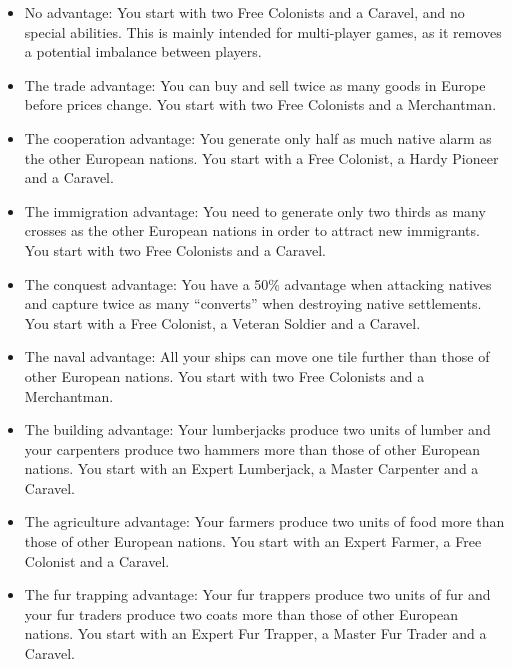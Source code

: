 \documentclass[12pt]{book}
\begin{document}
\begin{itemize}

\item No advantage: You start with two Free Colonists and a Caravel,
  and no special abilities. This is mainly intended for multi-player
  games, as it removes a potential imbalance between players.

\item The trade advantage: You can buy and sell twice as many goods in
  Europe before prices change. You start with two Free Colonists and a
  Merchantman.

\item The cooperation advantage: You generate only half as much native
  alarm as the other European nations. You start with a Free Colonist,
  a Hardy Pioneer and a Caravel.

\item The immigration advantage: You need to generate only two thirds
  as many crosses as the other European nations in order to attract
  new immigrants. You start with two Free Colonists and a Caravel.

\item The conquest advantage: You have a 50\% advantage when attacking
  natives and capture twice as many ``converts'' when destroying
  native settlements. You start with a Free Colonist, a Veteran
  Soldier and a Caravel.

\item The naval advantage: All your ships can move one tile further
  than those of other European nations. You start with two Free
  Colonists and a Merchantman.

\item The building advantage: Your lumberjacks produce two units of
  lumber and your carpenters produce two hammers more than those of
  other European nations. You start with an Expert Lumberjack, a
  Master Carpenter and a Caravel.

\item The agriculture advantage: Your farmers produce two units of
  food more than those of other European nations. You start with an
  Expert Farmer, a Free Colonist and a Caravel.

\item The fur trapping advantage: Your fur trappers produce two units
  of fur and your fur traders produce two coats more than those of
  other European nations. You start with an Expert Fur Trapper, a
  Master Fur Trader and a Caravel.

\end{itemize}
\end{document}
